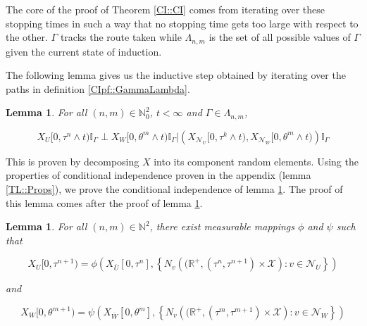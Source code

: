 \documentclass[12pt]{article}
\newcommand{\mb}{\mathbb}
\newcommand{\mc}{\mathcal}
\newcommand{\ov}{\overline}
\newcommand{\ind}{\hspace{24pt}}
\newcommand{\sta}{\mc{X}}							%
\newcommand{\neigh}[1]{\mc{N}_{#1}}					%
\newcommand{\cl}[1]{\ov{#1}}						%
\newcommand{\indx}[1]{^{#1}}						%
\newcommand{\Xf}{X}									%
\newcommand{\poiss}{N}								%
\newcommand{\poissv}[1]{_{#1}}						%
\newcommand{\vind}[1]{_{#1}}						%
\newcommand{\tmi}[1]{#1}							%
\newcommand{\seto}{U}								%
\newcommand{\sett}{W}								%
\newcommand{\rtt}{\theta}							%
\newcommand{\apath}{\Gamma}						%
\newcommand{\pathset}[2]{\Lambda_{#1,#2}}		%
\newcommand{\indo}{n}							%
\newcommand{\indt}{m}							%
\newcommand{\rt}{\tau}								%
\newtheorem{lem}[thms]{Lemma}
\begin{document}
The core of the proof of Theorem \ref{CI::CI} comes from iterating over these stopping times in such a way that no stopping time gets too large with respect to the other. \(\apath\) tracks the route taken while \(\pathset{\indo}{\indt}\) is the set of all possible values of \(\apath\) given the current state of induction.

\ind The following lemma gives us the inductive step obtained by iterating over the paths in definition \ref{CIpf::GammaLambda}.

\begin{lem}
For all \((\indo,\indt)\in \mb{N}_0^2\), \(t < \infty\) and \(\apath \in \pathset{\indo}{\indt}\),

\[\Xf\vind{\seto}\tmi{[0,\rt\indx{\indo}\wedge t)}\mb{I}_{\apath}\perp \Xf\vind{\sett}\tmi{[0,\rtt\indx{\indt}\wedge t)}\mb{I}_{\apath}|\left(\Xf\vind{\neigh{\seto}}\tmi{[0,\rt\indx{k}\wedge t)},\Xf\vind{\neigh{\sett}}\tmi{[0,\rtt\indx{\indt}\wedge t)}\right)\mb{I}_{\apath}\]
\label{CIpf::Induction}
\end{lem}

This is proven by decomposing \(\Xf\) into its component random elements. Using the properties of conditional independence proven in the appendix (lemma \ref{TL::Props}), we prove the conditional independence of lemma \ref{CIpf::Induction}. The proof of this lemma comes after the proof of lemma \ref{CIpf::Decomposition}.

\begin{lem}
For all \((\indo,\indt)\in \mb{N}^2\), there exist measurable mappings \(\phi\) and \(\psi\) such that 

\begin{equation}
\Xf\vind{\seto}\tmi{[0,\rt\indx{\indo+1})} = \phi\left(\Xf\vind{\cl{\seto}}\tmi{[0,\rt\indx{\indo}]}, \left\{\poiss\poissv{v}\left((\mb{R}^+,(\rt\indx{\indo},\rt\indx{\indo+1})\times \sta\right):v \in \neigh{\seto}\right\}\right)
\label{CIpf::XU forward map}
\end{equation}

and

\begin{equation}
\Xf\vind{\sett}\tmi{[0,\rtt\indx{\indt+1})} = \psi\left(\Xf\vind{\cl{\sett}}\tmi{[0,\rtt\indx{\indt}]}, \left\{\poiss\poissv{v}\left((\mb{R}^+,(\rt\indx{\indt},\rt\indx{\indt+1})\times \sta\right):v \in \neigh{\sett}\right\}\right)
\label{CIpf::XW forward map}
\end{equation}

\label{CIpf::Decomposition}
\end{lem}
\end{document}
